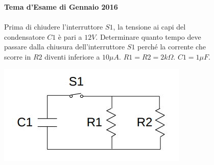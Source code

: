 \begin{figure}[h!]
\textbf{Tema d'Esame di Gennaio 2016}\\ \\
 Prima di chiudere l'interruttore $S1$, la tensione ai capi del condensatore $C1$ è pari a $12V$. Determinare quanto tempo deve passare dalla chiusura dell'interruttore $S1$ perché la corrente
che scorre in $R2$ diventi inferiore a $10 \mu A$. $R1=R2=2k\Omega$. $C1=1\mu F$.
	\begin{center}
		\includegraphics[scale=0.8]{ES5/GEN052016.jpg}
	\end{center}
\end{figure}

